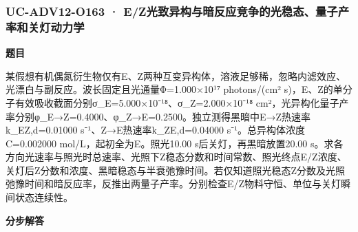 \documentclass[UTF8,11pt,a4paper]{ctexart}
\begin{document}
\subsubsection*{UC-ADV12-O163 · E/Z光致异构与暗反应竞争的光稳态、量子产率和关灯动力学}
\noindent\textbf{题目}\par
某假想有机偶氮衍生物仅有E、Z两种互变异构体，溶液足够稀，忽略内滤效应、光漂白与副反应。波长固定且光通量Φ=1.000×10¹⁷ photons/(cm² s)，E、Z的单分子有效吸收截面分别σ\_E=5.000×10⁻¹⁸、σ\_Z=2.000×10⁻¹⁸ cm²，光异构化量子产率分别φ\_E→Z=0.4000、φ\_Z→E=0.2500。独立测得黑暗中E→Z热速率k\_EZ,d=0.01000 s⁻¹、Z→E热速率k\_ZE,d=0.04000 s⁻¹。总异构体浓度C=0.002000 mol/L，起初全为E。照光10.00 s后关灯，再黑暗放置20.00 s。求各方向光速率与照光时总速率、光照下Z稳态分数和时间常数、照光终点E/Z浓度、关灯后Z分数和浓度、黑暗稳态与半衰弛豫时间。若仅知道照光稳态Z分数及光照弛豫时间和暗反应率，反推出两量子产率。分别检查E/Z物料守恒、单位与关灯瞬间状态连续性。\par
\medskip\noindent\textbf{分步解答}
\end{document}
